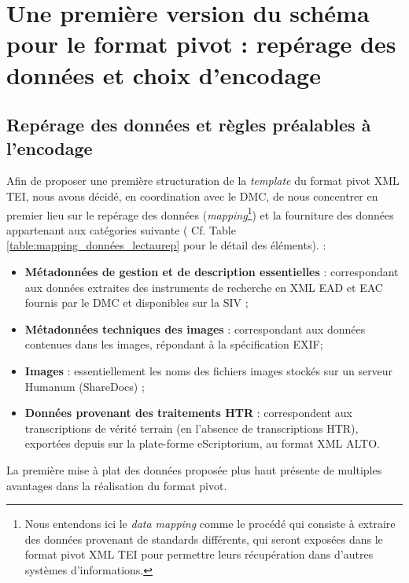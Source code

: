\section{Une première version du schéma pour le format pivot : repérage des données et choix d'encodage}

\subsection{Repérage des données et règles préalables à l'encodage}

Afin de proposer une première structuration de la \textit{template} du format pivot XML TEI, nous avons décidé, en coordination avec le DMC, de nous concentrer en premier lieu sur le repérage des données (\textit{mapping}\footnote{Nous entendons ici le \textit{data mapping} comme le procédé qui consiste à extraire des données provenant de standards différents, qui seront exposées dans le format pivot XML TEI pour permettre leurs récupération dans d'autres systèmes d'informations.}) et la fourniture des données appartenant aux catégories suivante ( Cf. Table \ref{table:mapping_données_lectaurep} pour le détail des éléments). :  
\bigskip
\begin{itemize}
    \item \textbf{Métadonnées de gestion et de description essentielles} : correspondant aux données extraites des instruments de recherche en XML EAD et EAC fournis par le DMC et disponibles sur la SIV ;
    \item \textbf{Métadonnées techniques des images} : correspondant aux données contenues dans les images, répondant à la spécification EXIF;
    \item \textbf{Images} : essentiellement les noms des fichiers images stockés sur un serveur Humanum (ShareDocs) ;
    \item \textbf{Données provenant des traitements HTR} : correspondent aux transcriptions de vérité terrain (en l'absence de transcriptions HTR), exportées depuis sur la plate-forme eScriptorium, au format XML ALTO.
\end{itemize}
\bigskip
La première mise à plat des données proposée plus haut présente de multiples avantages dans la réalisation du format pivot.\\ 

